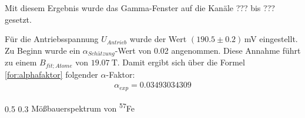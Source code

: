\documentclass[german, %
parskip=full, %
bibliography=totoc, %
]{scrartcl}
\makeatletter
\renewcommand\subsection{\@startsection 
   {subsection}{2}{0mm}%
   {0.5\baselineskip}%
   {0.3\baselineskip}%
   {\bfseries\sffamily\large}%
   }
\makeatother
\begin{document}
Mit diesem Ergebnis wurde das Gamma-Fenster auf die Kanäle ??? bis ??? gesetzt.

Für die Antriebsspannung $U_{Antrieb}$ wurde der Wert $(190.5 \pm 0.2)$\,mV eingestellt. Zu Beginn wurde ein $\alpha_{Schätzung}$-Wert von 0.02 angenommen. Diese Annahme führt zu einem $B_{fit;Atome}$ von \(\SI{19.07}{\tesla}\). Damit ergibt sich über die Formel \ref{for:alphafaktor} folgender $\alpha$-Faktor:
\begin{align*}
\alpha_{exp} = 0.03493034309
\end{align*} 

\subsection{Mößbauerspektrum von \textsuperscript{57}Fe}
\end{document}

